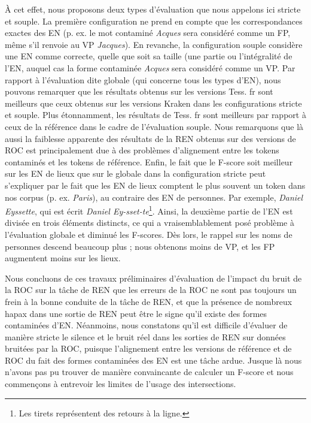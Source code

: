 À cet effet, nous proposons deux types d'évaluation que nous appelons ici \og{}stricte\fg{} et \og{}souple\fg{}. La première configuration ne prend en compte que les correspondances exactes des EN (p. ex. le mot contaminé \textit{Acques} sera considéré comme un FP, même s'il renvoie au VP \textit{Jacques}). En revanche, la configuration \og{}souple\fg{} considère une EN comme correcte, quelle que soit sa taille (une partie ou l'intégralité de l'EN, auquel cas la forme contaminée \textit{Acques} sera considéré comme un VP. Par rapport à l'évaluation dite \og{}globale\fg{} (qui concerne tous les types d'EN), nous pouvons remarquer que les résultats obtenus sur les versions Tess. fr sont meilleurs que ceux obtenus sur les versions Kraken dans les configurations stricte et souple.
  Plus étonnamment, les résultats de Tess. fr sont meilleurs par rapport à ceux de la référence dans le cadre de l'évaluation souple.
 Nous remarquons que là aussi la faiblesse apparente des résultats de la REN obtenus sur des versions de ROC est principalement due à des problèmes d'alignement entre les tokens contaminés et les tokens de référence. 
  Enfin, le fait que le F-score soit meilleur sur les EN de lieux que sur le globale dans la configuration stricte peut s'expliquer par le fait que les EN de lieux comptent le plus souvent un token dans nos corpus (p. ex. \textit{Paris}), au contraire des EN de personnes. Par exemple, \textit{Daniel Eyssette}, qui est écrit \textit{Daniel Ey-sset-te}\footnote{Les tirets représentent des retours à la ligne.}. Ainsi, la deuxième partie de l'EN est divisée en trois éléments distincts, ce qui a vraisemblablement posé problème à l'évaluation globale et diminué les F-scores. Dès lors, le rappel sur les noms de personnes descend beaucoup plus ; nous obtenons moins de VP, et les FP augmentent moins sur les lieux.


Nous concluons de ces travaux préliminaires d'évaluation de l'impact du bruit de la ROC sur la tâche de REN que les erreurs de la ROC ne sont pas toujours un frein à la bonne conduite de la tâche de REN, et que la présence de nombreux hapax dans une sortie de REN peut être le signe qu'il existe des formes contaminées d'EN. Néanmoins, nous constatons qu'il est difficile d'évaluer de manière stricte le silence et le bruit réel dans les sorties de REN sur données bruitées par la ROC, puisque l'alignement entre les versions de référence et de ROC du fait des formes contaminées des EN est une tâche ardue. Jusque là nous n'avons pas pu trouver de manière convaincante de calculer un F-score et nous commençons à entrevoir les limites de l'usage des intersections.


